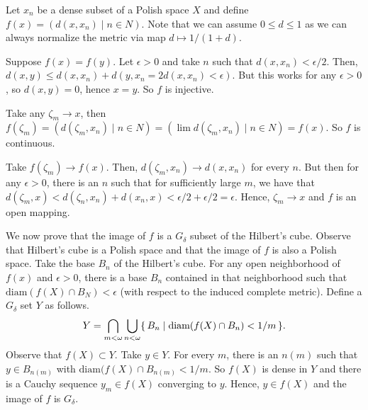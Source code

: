 \documentclass[12pt]{article}
\theoremstyle{definition}
\newenvironment{customthm}[1]
  {\renewcommand\theinnercustomthm{#1}\innercustomthm}
  {\endinnercustomthm}
\begin{document}
\begin{customthm}{I.4.20}
    Let $x_n$ be a dense subset of a Polish space $X$ and define $f(x) = (d(x,x_n) \mid n \in N)$. Note that we can assume $0 \leq d \leq 1$ as we can always normalize the metric via map $d \mapsto 1/(1+d)$.
    
    Suppose $f(x)=f(y)$. Let $\epsilon > 0$ and take $n$ such that $d(x,x_n) < \epsilon/2$. Then, $d(x,y) \leq d(x,x_n) + d(y,x_n = 2d(x,x_n) < \epsilon)$. But this works for any $\epsilon > 0$, so $d(x,y)=0$, hence $x=y$. So $f$ is injective.
    
    Take any $\zeta_m \to x$, then 
    $f(\zeta_m) = (d(\zeta_m,x_n) \mid n \in N) = ( \lim d(\zeta_m, x_n) \mid n \in N) = f(x)$. So $f$ is continuous.
    
    Take $f(\zeta_m) \to f(x)$. Then, $d(\zeta_m,x_n) \to d(x,x_n)$ for every $n$. But then for any $\epsilon > 0$, there is an $n$ such that for sufficiently large $m$, we have that $d(\zeta_m,x) < d(\zeta_n, x_n) + d(x_n,x) < \epsilon/2 + \epsilon/2 = \epsilon$. Hence, $\zeta_m \to x$ and $f$ is an open mapping.
    
    We now prove that the image of $f$ is a $G_\delta$ subset of the Hilbert's cube. Observe that Hilbert's cube is a Polish space and that the image of $f$ is also a Polish space. Take the base $B_n$ of the Hilbert's cube. For any open neighborhood of $f(x)$ and $\epsilon>0$, there is a base $B_n$ contained in that neighborhood such that $\text{diam}(f(X) \cap B_N) < \epsilon$ (with respect to the induced complete metric). Define a $G_\delta$ set $Y$ as follows.
    \begin{equation*}
        Y = \bigcap_{m<\omega} \bigcup_{n<\omega} \{\,{B_n \mid \text{diam}(f(X) \cap B_n) < 1/m}\,\}.
    \end{equation*}
    Observe that $f(X) \subset Y$. Take $y \in Y$. For every $m$, there is an $n(m)$ such that $y \in B_{n(m)}$ with $\text{diam}(f(X) \cap B_{n(m)} < 1/m$. So $f(X)$ is dense in $Y$ and there is a Cauchy sequence $y_m \in f(X)$ converging to $y$. Hence, $y \in f(X)$ and the image of $f$ is $G_\delta$.
\end{customthm}
\end{document}
